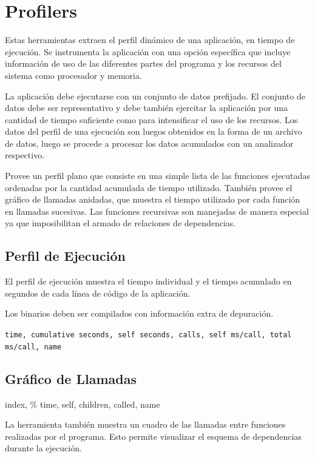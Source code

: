 \documentclass[a4paper]{report}
\begin{document}
\section{Profilers}

Estas herramientas extraen el perfil din\'amico de una aplicaci\'on, en tiempo
de ejecuci\'on. Se instrumenta la aplicaci\'on con una opci\'on espec\'ifica que
incluye informaci\'on de uso de las diferentes partes del programa y los
recursos del sistema como procesador y memoria.

\bigskip

La aplicaci\'on debe ejecutarse con un conjunto de datos prefijado. El conjunto de
datos debe ser representativo y debe tambi\'en ejercitar la aplicaci\'on por
una cantidad de tiempo suficiente como para intensificar el uso de los
recursos. Los datos del perfil de una ejecuci\'on son luegos obtenidos en la
forma de un archivo de datos, luego se procede a procesar los datos acumulados
con un analizador respectivo.

\bigskip

Provee un perfil plano que consiste en una simple lista de las funciones
ejecutadas ordenadas por la cantidad acumulada de tiempo utilizado.
Tambi\'en provee el gr\'afico de llamadas anidadas, que muestra el tiempo
utilizado por cada funci\'on en llamadas sucesivas. Las funciones recursivas
son manejadas de manera especial ya que imposibilitan el armado de relaciones
de dependencias.

\subsection{Perfil de Ejecuci\'on}

El perfil de ejecuci\'on muestra el tiempo individual y el tiempo acumulado en segundos
de cada l\'inea de c\'odigo de la aplicaci\'on.

Los binarios deben ser compilados con informaci\'on extra de depuraci\'on.

{\tt time, cumulative seconds, self seconds, calls, self ms/call,
  total ms/call, name}

\subsection{Gr\'afico de Llamadas}

index, \% time, self, children, called, name

La herramienta tambi\'en muestra un cuadro de las llamadas entre funciones realizadas por el programa.
Esto permite visualizar el esquema de dependencias durante la ejecuci\'on.
\end{document}

